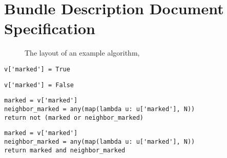 \section{Bundle Description Document Specification}
\label{sec:bundle-descr-docum}

\begin{figure}[p]
  \centering
  \small
  \begin{minipage}{.4\textwidth}
  \end{minipage}
  \caption{The layout of an example algorithm, }
  \label{fig:interop:ssax-structure}
\end{figure}
\begin{lstlisting}[float=p,caption={\directory{moves/mark.py}},label={lst:ex:mark}]
v['marked'] = True
\end{lstlisting}
\begin{lstlisting}[float=p,caption={\directory{moves/unmark.py}},label={lst:ex:unmark}]
v['marked'] = False
\end{lstlisting}
\begin{lstlisting}[float=p,caption={\directory{predicates/unmarked-and-neighbors-unmarked.py}},label={lst:ex:should-mark}]
marked = v['marked']
neighbor_marked = any(map(lambda u: u['marked'], N))
return not (marked or neighbor_marked)
\end{lstlisting}
\begin{lstlisting}[float=p,caption={\directory{predicates/marked-and-neighbor-marked.py}},label={lst:ex:should-unmark}]
marked = v['marked']
neighbor_marked = any(map(lambda u: u['marked'], N))
return marked and neighbor_marked
\end{lstlisting}
